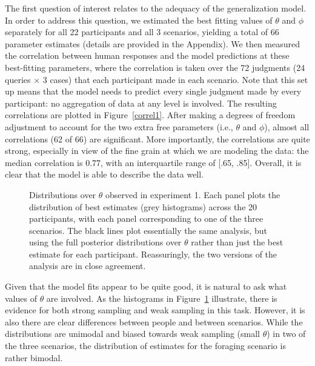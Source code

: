 \documentclass[doc]{apa6}
\begin{document}
The first question of interest relates to the adequacy of the generalization model. In order to address this question, we estimated the best fitting values of $\theta$ and $\phi$ separately for all 22 participants and all 3 scenarios, yielding a total of 66 parameter estimates (details are provided in the Appendix). We then measured the correlation between human responses and the model predictions at these best-fitting parameters, where the correlation is taken over the 72 judgments (24 queries $\times$ 3 cases) that each participant made in each scenario. Note that this set up means that the model needs to predict every single judgment made by every participant: no aggregation of data at any level is involved. The resulting correlations are plotted in Figure~\ref{correl1}. After making a degrees of freedom adjustment to account for the two extra free parameters (i.e., $\theta$ and $\phi$), almost all correlations (62 of 66) are significant. More importantly, the correlations are quite strong, especially in view of the fine grain at which we are modeling the data: the median correlation is 0.77, with an interquartile range of [.65, .85]. Overall, it is clear that the model is able to describe the data well.



\begin{figure}[t]
\begin{center}
\caption{Distributions over $\theta$ observed in experiment 1. Each panel plots the distribution of best estimates (grey histograms) across the 20 participants, with each panel corresponding to one of the three scenarios. The black lines plot essentially the same analysis, but using the full posterior distributions over $\theta$ rather than just the best estimate for each participant. Reassuringly, the two versions of the analysis are in close agreement.}
\label{margpost1}
\end{center}
\end{figure}



Given that the model fits appear to be quite good, it is natural to ask what values of $\theta$ are involved. As the histograms in Figure~\ref{margpost1} illustrate, there is evidence for both strong sampling and weak sampling in this task. However, it is also there are clear differences between people and between scenarios. While the distributions are unimodal and biased towards weak sampling (small $\theta$) in two of the three scenarios,  the distribution of estimates for the foraging scenario is rather bimodal.
\end{document}
